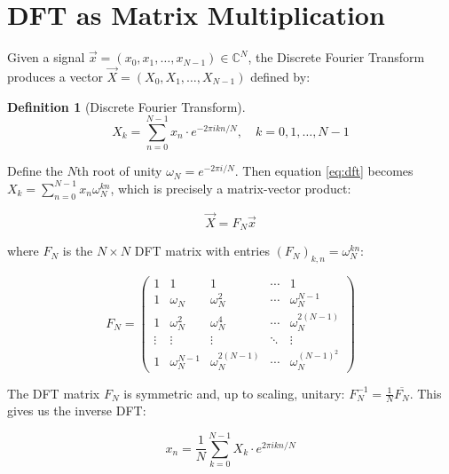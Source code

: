 \documentclass[12pt,a4paper]{report}
\theoremstyle{thms}
\theoremstyle{defns}
\newtheorem{definition}{Definition}[section]
\begin{document}
\section{DFT as Matrix Multiplication}
\label{sec:dft_matrix}

Given a signal $\vec{x} = (x_0, x_1, \ldots, x_{N-1}) \in \mathbb{C}^N$, the Discrete Fourier Transform produces a vector $\vec{X} = (X_0, X_1, \ldots, X_{N-1})$ defined by:

\begin{definition}[Discrete Fourier Transform]
    \begin{equation}
        X_k = \sum_{n=0}^{N-1} x_n \cdot e^{-2\pi i kn/N}, \quad k = 0, 1, \ldots, N-1
        \label{eq:dft}
    \end{equation}
\end{definition}

Define the $N$th root of unity $\omega_N = e^{-2\pi i/N}$. Then equation \eqref{eq:dft} becomes $X_k = \sum_{n=0}^{N-1} x_n \omega_N^{kn}$, which is precisely a matrix-vector product:

\begin{equation}
    \vec{X} = F_N \vec{x}
\end{equation}

where $F_N$ is the $N \times N$ DFT matrix with entries $(F_N)_{k,n} = \omega_N^{kn}$:

\begin{equation}
    F_N = \begin{pmatrix}
        1      & 1              & 1                  & \cdots & 1                      \\
        1      & \omega_N       & \omega_N^2         & \cdots & \omega_N^{N-1}         \\
        1      & \omega_N^2     & \omega_N^4         & \cdots & \omega_N^{2(N-1)}      \\
        \vdots & \vdots         & \vdots             & \ddots & \vdots                 \\
        1      & \omega_N^{N-1} & \omega_N^{2(N-1)}  & \cdots & \omega_N^{(N-1)^2}
    \end{pmatrix}
\end{equation}

The DFT matrix $F_N$ is symmetric and, up to scaling, unitary: $F_N^{-1} = \frac{1}{N}\overline{F_N}$. This gives us the inverse DFT:

\begin{equation}
    x_n = \dfrac{1}{N}\sum_{k=0}^{N-1} X_k \cdot e^{2\pi i kn/N}
\end{equation}
\end{document}
